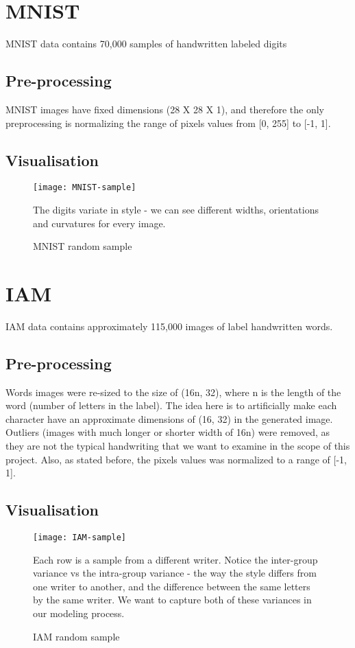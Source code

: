 

\section{MNIST}

MNIST data contains 70,000 samples of handwritten labeled digits \cite{1} 

\subsection{Pre-processing}

MNIST images have fixed dimensions (28 X 28 X 1), and therefore the only preprocessing is normalizing the range of pixels values from [0, 255] to [-1, 1].



\subsection{Visualisation}

\begin{figure}[h]
\centering
\texttt{[image: MNIST-sample]}
\caption{MNIST random sample}
\label{fig:x cubed graph}
The digits variate in style - we can see different widths, orientations and curvatures for every image.
\end{figure}


\section{IAM}

IAM data contains approximately 115,000 images of label handwritten words.  \cite{2} 

\subsection{Pre-processing}

Words images were re-sized to the size of (16n, 32), where n is the length of the word (number of letters in the label). The idea here is to artificially make each character have an approximate dimensions of (16, 32) in the generated image. 
Outliers (images with much longer or shorter width of 16n) were removed, as they are not the typical handwriting that we want to examine in the scope of this project.
Also, as stated before, the pixels values was normalized to a range of [-1, 1]. 


\subsection{Visualisation}

\begin{figure}[h]
\centering
\texttt{[image: IAM-sample]}
\caption{IAM random sample}
\label{fig:x cubed graph}
Each row is a sample from a different writer. Notice the inter-group variance vs the intra-group variance - the way the style differs from one writer to another, and the difference between the same letters by the same writer. We want to capture both of these variances in our modeling process.
\end{figure}